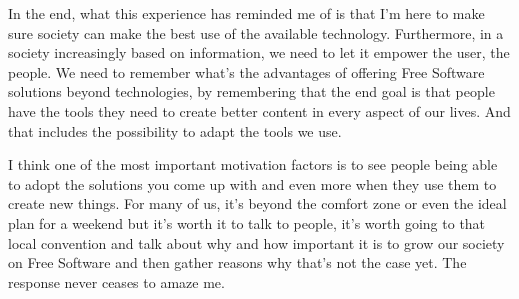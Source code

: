 In the end, what this experience has reminded me of is that I'm here to make sure society can make the best use of the available technology. Furthermore, in a society increasingly based on information, we need to let it empower the user, the people. We need to remember what's the advantages of offering Free Software solutions beyond technologies, by remembering that the end goal is that people have the tools they need to create better content in every aspect of our lives. And that includes the possibility to adapt the tools we use.

I think one of the most important motivation factors is to see people being able to adopt the solutions you come up with and even more when they use them to create new things. For many of us, it's beyond the comfort zone or even the ideal plan for a weekend but it's worth it to talk to people, it's worth going to that local convention and talk about why and how important it is to grow our society on Free Software and then gather reasons why that's not the case yet. The response never ceases to amaze me.
